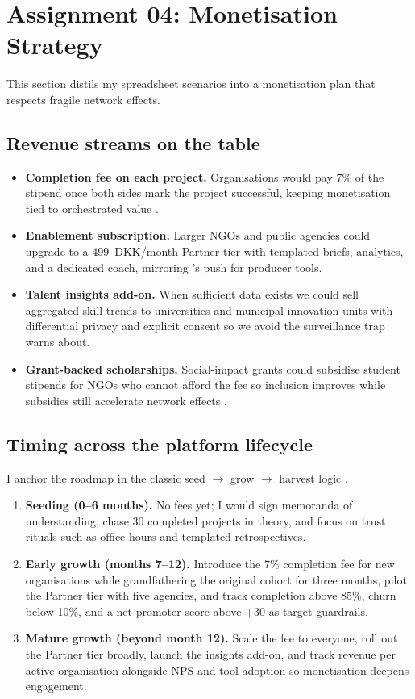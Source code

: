 \section*{Assignment 04: Monetisation Strategy}

This section distils my spreadsheet scenarios into a monetisation plan that respects fragile network effects.

\subsection*{Revenue streams on the table}
\begin{itemize}
  \item \textbf{Completion fee on each project.} Organisations would pay 7\% of the stipend once both sides mark the project successful, keeping monetisation tied to orchestrated value \citep{HagiuWright2013}.
  \item \textbf{Enablement subscription.} Larger NGOs and public agencies could upgrade to a 499~DKK/month Partner tier with templated briefs, analytics, and a dedicated coach, mirroring \citet{Choudary2016}'s push for producer tools.
  \item \textbf{Talent insights add-on.} When sufficient data exists we could sell aggregated skill trends to universities and municipal innovation units with differential privacy and explicit consent so we avoid the surveillance trap \citet{Zuboff2019} warns about.
  \item \textbf{Grant-backed scholarships.} Social-impact grants could subsidise student stipends for NGOs who cannot afford the fee so inclusion improves while subsidies still accelerate network effects \citep{ShapiroVarian1999}.
\end{itemize}

\subsection*{Timing across the platform lifecycle}
I anchor the roadmap in the classic seed $\rightarrow$ grow $\rightarrow$ harvest logic \citep{Choudary2016}.
\begin{enumerate}
  \item \textbf{Seeding (0--6 months).} No fees yet; I would sign memoranda of understanding, chase 30 completed projects in theory, and focus on trust rituals such as office hours and templated retrospectives.
  \item \textbf{Early growth (months 7--12).} Introduce the 7\% completion fee for new organisations while grandfathering the original cohort for three months, pilot the Partner tier with five agencies, and track completion above 85\%, churn below 10\%, and a net promoter score above +30 as target guardrails.
  \item \textbf{Mature growth (beyond month 12).} Scale the fee to everyone, roll out the Partner tier broadly, launch the insights add-on, and track revenue per active organisation alongside NPS and tool adoption so monetisation deepens engagement.
\end{enumerate}

